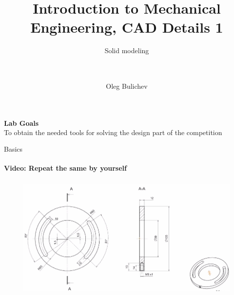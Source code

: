 \documentclass[aspectratio=169]{beamer}
\title[IME]{Introduction to Mechanical Engineering, CAD Details 1} %
\subtitle{ Solid modeling \\ \ \\ \ 
         } %
\author{Oleg Bulichev}
\newcommand{\fbckg}[1]{\usebackgroundtemplate{\texttt{[image: \#1]}}}%
\begin{document}
\setlength{\abovedisplayskip}{0pt}
\setlength{\belowdisplayskip}{0pt}
\setlength{\abovedisplayshortskip}{0pt}
\setlength{\belowdisplayshortskip}{0pt}

\fbckg{fibeamer/figs/title_page.png}

\fbckg{fibeamer/figs/common.png}

\note{\scriptsize \begin{itemize}
        \item \
    \end{itemize}}


\begin{frame}[c]{}
\framesubtitle{}
\centering \LARGE \textbf{Lab Goals} \\
To obtain the needed tools for solving the design part of the competition
\end{frame}

\begin{frame}[t]{Basics}
    \framesubtitle{Video: Repeat the same by yourself}
    \vspace{-0.6cm}
    \begin{figure}[H]
        \href{https://disk.yandex.ru/d/DQ8daMqRHrt2iw}{
            \centering\includegraphics[height=6cm,width=1\textwidth,keepaspectratio]{resources/task_0.png}}
        \label{fig:1}
    \end{figure}
\end{frame}
\end{document}
